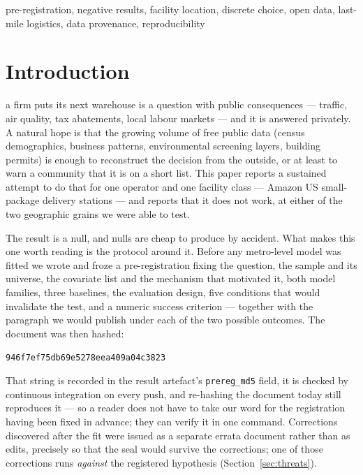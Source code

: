 \documentclass[conference]{IEEEtran}
\begin{document}
\begin{IEEEkeywords}
pre-registration, negative results, facility location, discrete choice,
open data, last-mile logistics, data provenance, reproducibility
\end{IEEEkeywords}

\section{Introduction}

 a firm puts its next warehouse is a question with
public consequences --- traffic, air quality, tax abatements, local labour
markets --- and it is answered privately. A natural hope is that the growing
volume of free public data (census demographics, business patterns,
environmental screening layers, building permits) is enough to reconstruct the
decision from the outside, or at least to warn a community that it is on a
short list. This paper reports a sustained attempt to do that for one operator
and one facility class --- Amazon US small-package delivery stations --- and
reports that it does not work, at either of the two geographic grains we were
able to test.

The result is a null, and nulls are cheap to produce by accident. What makes
this one worth reading is the protocol around it. Before any metro-level model
was fitted we wrote and froze a pre-registration fixing the question, the
sample and its universe, the covariate list and the mechanism that motivated
it, both model families, three baselines, the evaluation design, five
conditions that would invalidate the test, and a numeric success criterion ---
together with the paragraph we would publish under each of the two possible
outcomes. The document was then hashed:

\begin{center}
\texttt{946f7ef75db69e5278eea409a04c3823}
\end{center}

\noindent That string is recorded in the result artefact's
\texttt{prereg\_md5} field, it is checked by continuous integration on every
push, and re-hashing the document today still reproduces it --- so a reader
does not have to take our word for the registration having been fixed in
advance; they can verify it in one command. Corrections discovered after the
fit were issued as a separate errata document rather than as edits, precisely
so that the seal would survive the corrections; one of those corrections runs
\emph{against} the registered hypothesis
(Section~\ref{sec:threats}).
\end{document}
